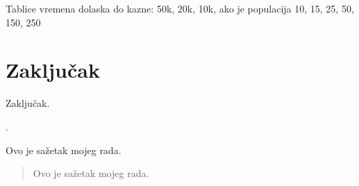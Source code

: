 \documentclass[times, utf8, zavrsni]{fer}
\begin{document}
Tablice vremena dolaska do kazne: 50k, 20k, 10k, ako je populacija 10, 15, 25, 50, 150, 250

\chapter{Zaključak}
Zaključak.

.


\begin{sazetak}
Ovo je sažetak mojeg rada.

\end{sazetak}

\begin{abstract}
Ovo je sažetak mojeg rada.

\end{abstract}
\end{document}
